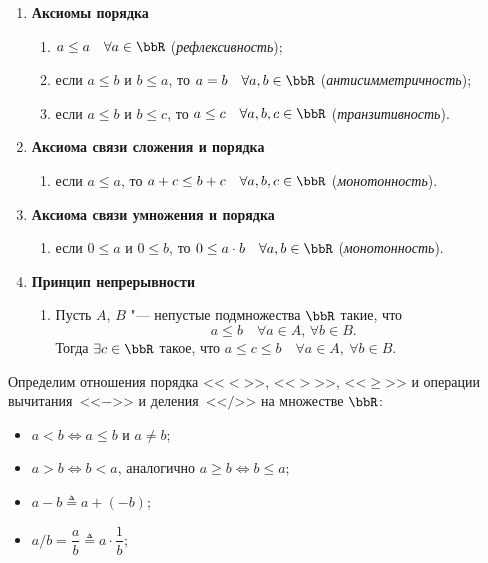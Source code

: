 \begin{enumerate}[label=\Roman*.]
\begin{enumerate}[resume, label=\arabic*.]
\end{enumerate}
\item
\textbf{Аксиомы порядка} 
\begin{enumerate}[resume, label=\arabic*.]
\item 
$ a \le a\quad \forall a \in \bbR$ (\textit{рефлексивность});
\item
если $ a\le b$ и $b\le a$, то $a=b \quad \forall a,b\in\bbR$ (\textit{антисимметричность});
\item
если $a\le b$ и $b\le c$, то $a\le c\quad \forall a,b,c\in \bbR$ (\textit{транзитивность}).
\end{enumerate}
\item
\textbf{Аксиома связи сложения и порядка}
\begin{enumerate}[resume, label=\arabic*.]
\item 
если $ a \le a$, то $ a + c \le b + c\quad \forall a,b,c \in \bbR$ (\textit{монотонность}).
\end{enumerate}
\item
\textbf{Аксиома связи умножения и порядка}
\begin{enumerate}[resume, label=\arabic*.]
\item 
если $ 0 \le a$ и $0\le b$, то $ 0 \le a\cdot b\quad \forall a,b \in \bbR$ (\textit{монотонность}).
\end{enumerate}
\item
\textbf{Принцип непрерывности}
\begin{enumerate}[resume, label=\arabic*.]
\item 
Пусть $A$, $B$ "--- непустые подмножества $\bbR$ такие, что
$$
a\le b\quad \forall a \in A, \,  \forall b \in B.
$$
Тогда $\exists c \in \bbR$ такое, что $a\le c\le b\quad \forall a \in A,\ \forall b\in B.$
\end{enumerate}
\end{enumerate}
\enlargethispage{\baselineskip}
\begin{defn}
Определим отношения порядка <<$<$>>, <<$>$>>, <<$\ge$>> и операции вычитания~<<$-$>> и деления~<<$/$>> на множестве $\bbR$:
\begin{itemize}[noitemsep,  topsep=0pt]
\item 
$a < b \Longleftrightarrow a \le b \text{ и } a\neq b$;
\item
$a > b \Longleftrightarrow b < a$, аналогично $a \ge b \Longleftrightarrow b \le a$;
\item
$a - b \triangleq a + (-b)$;
\item
$a / b =  \dfrac{a}{b} \triangleq a \cdot \dfrac{1}{b}$; 
\end{itemize}
\vspace{-1.0\baselineskip}%
\end{defn}

